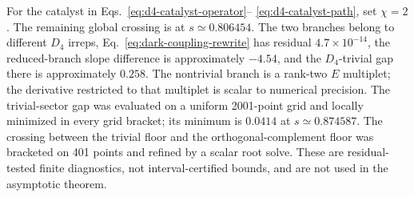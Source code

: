 For the catalyst in Eqs.~\eqref{eq:d4-catalyst-operator}--
\eqref{eq:d4-catalyst-path}, set $\chi=2$.  The remaining global crossing
is at $s\simeq0.806454$.  The two branches belong to different $D_4$ irreps,
Eq.~\eqref{eq:dark-coupling-rewrite} has residual
$4.7\times10^{-14}$, the reduced-branch slope difference is approximately
$-4.54$, and the $D_4$-trivial gap there is approximately $0.258$.  The
nontrivial branch is a rank-two $E$ multiplet; the derivative restricted to
that multiplet is scalar to numerical precision.  The trivial-sector gap
was evaluated on a uniform 2001-point grid
and locally minimized in every grid bracket; its minimum is $0.0414$ at
$s\simeq0.874587$.  The crossing between the trivial floor and the
orthogonal-complement floor was bracketed on 401 points and refined by a
scalar root solve.  These are residual-tested finite diagnostics, not
interval-certified bounds, and are not used in the asymptotic theorem.
